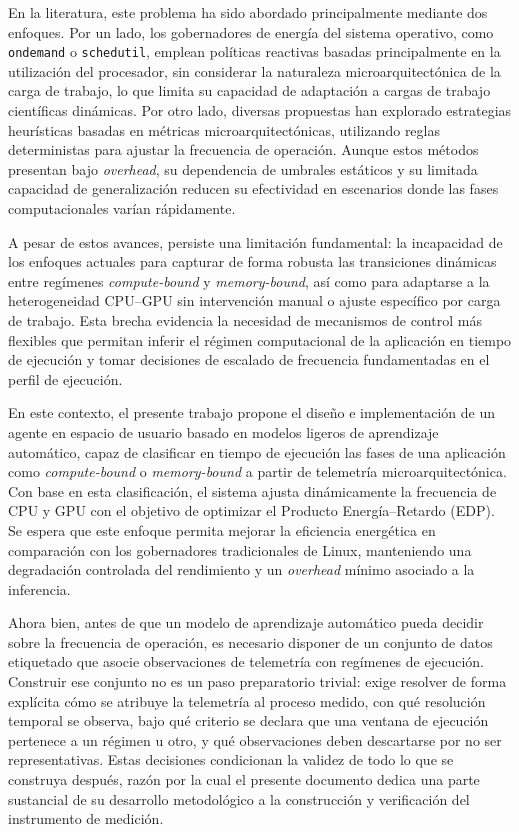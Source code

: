 \documentclass[12pt,oneside,spanish]{book}
\begin{document}
En la literatura, este problema ha sido abordado principalmente mediante dos enfoques. Por un lado, los gobernadores de energía del sistema operativo, como \texttt{ondemand} o \texttt{schedutil}, emplean políticas reactivas basadas principalmente en la utilización del procesador, sin considerar la naturaleza microarquitectónica de la carga de trabajo, lo que limita su capacidad de adaptación a cargas de trabajo científicas dinámicas. Por otro lado, diversas propuestas han explorado estrategias heurísticas basadas en métricas microarquitectónicas, utilizando reglas deterministas para ajustar la frecuencia de operación. Aunque estos métodos presentan bajo \textit{overhead}, su dependencia de umbrales estáticos y su limitada capacidad de generalización reducen su efectividad en escenarios donde las fases computacionales varían rápidamente.

A pesar de estos avances, persiste una limitación fundamental: la incapacidad de los enfoques actuales para capturar de forma robusta las transiciones dinámicas entre regímenes \textit{compute-bound} y \textit{memory-bound}, así como para adaptarse a la heterogeneidad CPU--GPU sin intervención manual o ajuste específico por carga de trabajo. Esta brecha evidencia la necesidad de mecanismos de control más flexibles que permitan inferir el régimen computacional de la aplicación en tiempo de ejecución y tomar decisiones de escalado de frecuencia fundamentadas en el perfil de ejecución.

En este contexto, el presente trabajo propone el diseño e implementación de un agente en espacio de usuario basado en modelos ligeros de aprendizaje automático, capaz de clasificar en tiempo de ejecución las fases de una aplicación como \textit{compute-bound} o \textit{memory-bound} a partir de telemetría microarquitectónica. Con base en esta clasificación, el sistema ajusta dinámicamente la frecuencia de CPU y GPU con el objetivo de optimizar el Producto Energía--Retardo (EDP). Se espera que este enfoque permita mejorar la eficiencia energética en comparación con los gobernadores tradicionales de Linux, manteniendo una degradación controlada del rendimiento y un \textit{overhead} mínimo asociado a la inferencia.

Ahora bien, antes de que un modelo de aprendizaje automático pueda decidir sobre la frecuencia de operación, es necesario disponer de un conjunto de datos etiquetado que asocie observaciones de telemetría con regímenes de ejecución. Construir ese conjunto no es un paso preparatorio trivial: exige resolver de forma explícita cómo se atribuye la telemetría al proceso medido, con qué resolución temporal se observa, bajo qué criterio se declara que una ventana de ejecución pertenece a un régimen u otro, y qué observaciones deben descartarse por no ser representativas. Estas decisiones condicionan la validez de todo lo que se construya después, razón por la cual el presente documento dedica una parte sustancial de su desarrollo metodológico a la construcción y verificación del instrumento de medición.
\end{document}
